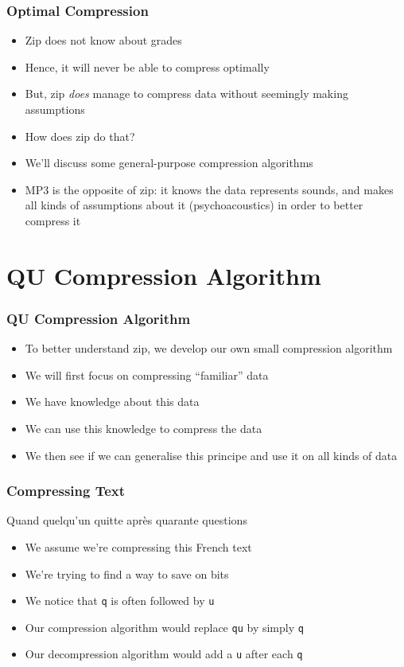 \begin{frame}
  \frametitle{Optimal Compression}
  \begin{itemize}
    \item Zip does not know about grades
    \item Hence, it will never be able to compress optimally
    \item But, zip \emph{does} manage to compress data without seemingly making assumptions
    \item How does zip do that?
    \item We'll discuss some general-purpose compression algorithms
    \item MP3 is the opposite of zip: it knows the data represents sounds,
          and makes all kinds of assumptions about it (psychoacoustics)
          in order to better compress it
  \end{itemize}
\end{frame}

\section{QU Compression Algorithm}

\begin{frame}
  \tableofcontents[currentsection]
\end{frame}

\begin{frame}
  \frametitle{QU Compression Algorithm}
  \begin{itemize}
    \item To better understand zip, we develop our own small compression algorithm
    \item We will first focus on compressing ``familiar'' data
    \item We have knowledge about this data
    \item We can use this knowledge to compress the data
    \item We then see if we can generalise this principe and use
          it on all kinds of data
  \end{itemize}
\end{frame}

\begin{frame}
  \frametitle{Compressing Text}
  \begin{center}
    Quand quelqu'un quitte apr\`es quarante questions
  \end{center}
  \begin{itemize}
    \item We assume we're compressing this French text
    \item We're trying to find a way to save on bits
    \item We notice that {\tt q} is often followed by {\tt u}
    \item Our compression algorithm would replace {\tt qu} by simply {\tt q}
    \item Our decompression algorithm would add a {\tt u} after each {\tt q}
  \end{itemize}
\end{frame}

